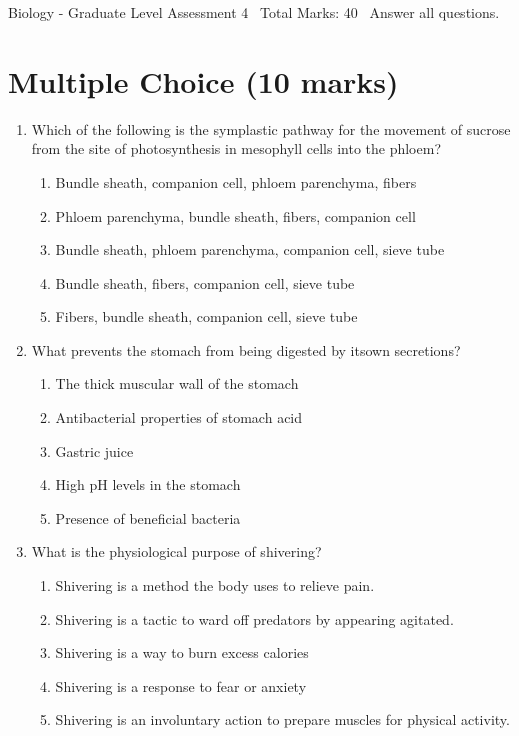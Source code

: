 \documentclass[12pt]{article}
\begin{document}
\begin{center}
Biology - Graduate Level Assessment 4 \
Total Marks: 40 \
Answer all questions.
\end{center}

\section*{Multiple Choice (10 marks)}
\begin{enumerate}[label=\arabic*.]
\item Which of the following is the symplastic pathway for the movement of sucrose from the site of photosynthesis in mesophyll cells into the phloem?
\begin{enumerate}[label=(\alph*)]
    \item Bundle sheath, companion cell, phloem parenchyma, fibers
    \item Phloem parenchyma, bundle sheath, fibers, companion cell
    \item Bundle sheath, phloem parenchyma, companion cell, sieve tube
    \item Bundle sheath, fibers, companion cell, sieve tube
    \item Fibers, bundle sheath, companion cell, sieve tube
\end{enumerate}
\item What prevents the stomach from being digested by itsown secretions?
\begin{enumerate}[label=(\alph*)]
    \item The thick muscular wall of the stomach
    \item Antibacterial properties of stomach acid
    \item Gastric juice
    \item High pH levels in the stomach
    \item Presence of beneficial bacteria
\end{enumerate}
\item What is the physiological purpose of shivering?
\begin{enumerate}[label=(\alph*)]
    \item Shivering is a method the body uses to relieve pain.
    \item Shivering is a tactic to ward off predators by appearing agitated.
    \item Shivering is a way to burn excess calories
    \item Shivering is a response to fear or anxiety
    \item Shivering is an involuntary action to prepare muscles for physical activity.

\end{enumerate}
\end{enumerate}
\end{document}
